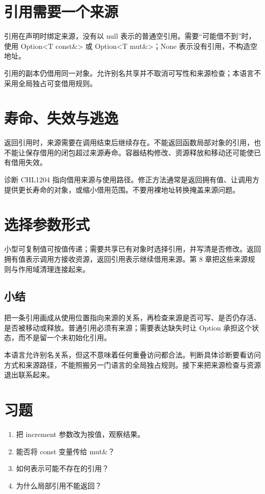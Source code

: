\section{引用需要一个来源}

引用在声明时绑定来源，没有以 null 表示的普通空引用。需要“可能借不到”时，使用 Option<T const\&> 或 Option<T mut\&>；None 表示没有引用，不构造空地址。

引用的副本仍借用同一对象。允许别名共享并不取消可写性和来源检查；本语言不采用全局独占可变借用规则。

\section{寿命、失效与逃逸}

返回引用时，来源需要在调用结束后继续存在。不能返回函数局部对象的引用，也不能让保存借用的闭包超过来源寿命。容器结构修改、资源释放和移动还可能使已有借用失效。

诊断 CHL1204 指向借用来源与使用路径。修正方法通常是返回拥有值、让调用方提供更长寿命的对象，或缩小借用范围。不要用裸地址转换掩盖来源问题。

\section{选择参数形式}

小型可复制值可按值传递；需要共享已有对象时选择引用，并写清是否修改。返回拥有值表示调用方接收资源，返回引用表示继续借用来源。第 8 章把这些来源规则与作用域清理连接起来。

\subsection*{小结}

把一条引用画成从使用位置指向来源的关系，再检查来源是否可写、是否仍存活、是否被移动或释放。普通引用必须有来源；需要表达缺失时让 Option 承担这个状态，而不是留一个未初始化引用。

本语言允许别名关系，但这不意味着任何重叠访问都合法。判断具体诊断要看访问方式和来源路径，不能照搬另一门语言的全局独占规则。接下来把来源检查与资源退出联系起来。

\section{习题}

\begin{enumerate}

\item 把 increment 参数改为按值，观察结果。

\item 能否将 const 变量传给 mut\&？

\item 如何表示可能不存在的引用？

\item 为什么局部引用不能返回？

\end{enumerate}

